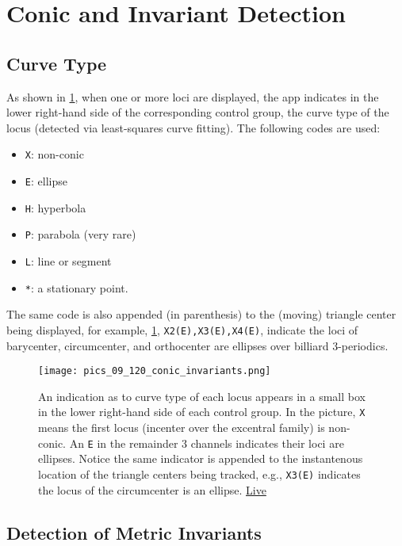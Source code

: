 \section{Conic and Invariant Detection}

\subsection{Curve Type}

As shown in \cref{fig:09-conic-invariants}, when one or more loci are displayed, the app  indicates in the lower right-hand side of the corresponding control group, the curve type of the locus (detected via least-squares curve fitting). The following codes are used:

\begin{itemize}
    \item \texttt{X}: non-conic
    \item \texttt{E}: ellipse
    \item \texttt{H}: hyperbola
    \item \texttt{P}: parabola (very rare)
    \item \texttt{L}: line or segment
    \item \texttt{*}: a stationary point.
\end{itemize}

The same code is also appended (in parenthesis) to the (moving) triangle center being displayed, for example, \cref{fig:09-conic-invariants}, \texttt{X2(E),X3(E),X4(E)}, indicate the loci of barycenter, circumcenter, and orthocenter are ellipses over billiard 3-periodics.

\begin{figure}
    \centering
    \texttt{[image: pics\_09\_120\_conic\_invariants.png]}
    \caption{An indication as to curve type of each locus appears in a small box in the lower right-hand side of each control group. In the picture, \texttt{X} means the first locus (incenter over the excentral family) is non-conic. An \texttt{E} in the remainder 3 channels indicates their loci are ellipses. Notice the same indicator is appended to the instantenous location of the triangle centers being tracked, e.g., \texttt{X3(E)} indicates the locus of the circumcenter is an ellipse. \href{https://bit.ly/3uXndpa}{Live}}
    \label{fig:09-conic-invariants}
\end{figure}

\subsection{Detection of Metric Invariants}

